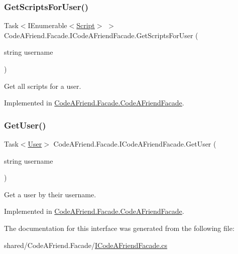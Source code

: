 \subsubsection{\texorpdfstring{Get\+Scripts\+For\+User()}{GetScriptsForUser()}}
{\footnotesize\ttfamily Task$<$I\+Enumerable$<$\mbox{\hyperlink{class_code_a_friend_1_1_data_model_1_1_script}{Script}}$>$ $>$ Code\+A\+Friend.\+Facade.\+I\+Code\+A\+Friend\+Facade.\+Get\+Scripts\+For\+User (\begin{DoxyParamCaption}\item[{string}]{username }\end{DoxyParamCaption})}



Get all scripts for a user.



Implemented in \mbox{\hyperlink{class_code_a_friend_1_1_facade_1_1_code_a_friend_facade_a77cd5040946e3a1feaac9fc03cfdb372}{Code\+A\+Friend.\+Facade.\+Code\+A\+Friend\+Facade}}.

\mbox{\label{interface_code_a_friend_1_1_facade_1_1_i_code_a_friend_facade_a2f9f5a0cf07b54b171af4770e519c30b}} 
\subsubsection{\texorpdfstring{Get\+User()}{GetUser()}}
{\footnotesize\ttfamily Task$<$\mbox{\hyperlink{class_code_a_friend_1_1_data_model_1_1_user}{User}}$>$ Code\+A\+Friend.\+Facade.\+I\+Code\+A\+Friend\+Facade.\+Get\+User (\begin{DoxyParamCaption}\item[{string}]{username }\end{DoxyParamCaption})}



Get a user by their username.



Implemented in \mbox{\hyperlink{class_code_a_friend_1_1_facade_1_1_code_a_friend_facade_a5cc08aa0377f29fd3f80e1d880059951}{Code\+A\+Friend.\+Facade.\+Code\+A\+Friend\+Facade}}.



The documentation for this interface was generated from the following file\+:\begin{DoxyCompactItemize}
\item 
shared/\+Code\+A\+Friend.\+Facade/\mbox{\hyperlink{_i_code_a_friend_facade_8cs}{I\+Code\+A\+Friend\+Facade.\+cs}}\end{DoxyCompactItemize}
